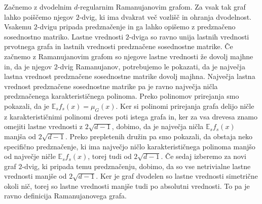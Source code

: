 Začnemo z dvodelnim \(d\)-regularnim Ramanujanovim grafom. Za vsak tak graf lahko poiščemo njegov \(2\)-dvig, ki ima dvakrat več vozlišč in ohranja dvodelnost. Vsakemu \(2\)-dvigu pripada predznačenje in ga lahko opišemo z predznačeno sosednostno matriko. Lastne vrednosti \(2\)-dviga so ravno unija lastnih vrednosti prvotnega grafa in lastnih vrednosti predznačene sosednostne matrike. Če začnemo z Ramanujanovim grafom so njegove lastne vrednosti že dovolj majhne in, da je njegov \(2\)-dvig Ramanujanov, potrebujemo le pokazati, da je največja lastna vrednost predznačene sosednostne matrike dovolj majhna. Največja lastna vrednost predznačene sosednostne matrike pa je ravno največja ničla predznačenega karakterističnega polinoma. Preko polinomov prirejanja smo pokazali, da je \(\mathbb E_{s}f_s(x) = \mu_G(x)\). Ker si polinomi prirejanja grafa delijo ničle z karakterističnimi polinomi dreves poti istega grafa in, ker za vsa drevesa znamo omejiti lastne vrednosti z \(2\sqrt{d-1}\), dobimo, da je največja ničla \(\mathbb E_{s}f_s(x)\) manjša od \(2\sqrt{d-1}\). Preko prepletenih družin pa smo pokazali, da obstaja neko specifično predznačenje, ki ima največjo ničlo karakterističnega polinoma manjšo od največje ničle \(\mathbb E_{s}f_s(x)\), torej tudi od \(2\sqrt{d-1}\). Če sedaj izberemo za novi graf \(2\)-dvig, ki pripada temu predznačenju, dobimo, da so vse netrivialne lastne vrednosti manjše od \(2\sqrt{d-1}\). Ker je graf dvodelen so lastne vrednosti simetrične okoli nič, torej so lastne vrednosti manjše tudi po absolutni vrednosti. To pa je ravno definicija Ramanujanovega grafa.

